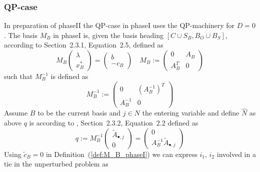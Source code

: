 \documentclass[a4paper]{article}
\begin{document}
\subsubsection{QP-case}
In preparation of phaseII the QP-case in phaseI uses the QP-machinery for $D=0$.
The basis $M_{B}$ in phaseI is, given the basis heading
$\left[C \cup S_{B}, B_{O} \cup B_{S} \right]$,
according to \cite{Sven} Section~2.3.1, Equation~2.5, defined as
\begin{equation}
\label{def:M_B_phaseI}
M_{B}
\left(\begin{array}{c}
        \lambda \\
	\hline
	x_{B}^{*}
      \end{array}
\right)
=
\left(\begin{array}{c}
        b \\
	\hline
	-c_{B}
       \end{array}
\right)
\quad
M_{B}:=
\left(\begin{array}{c|c}
        0 & A_{B} \\
	\hline
	A_{B}^{T} & 0 
       \end{array}
\right)
\end{equation}
such that $M_{B}^{-1}$ is defined as
\begin{equation}
\label{def:M_B_inv_phaseI}
M_{B}^{-1}:=
\left(\begin{array}{c|c}
        0 & \left(A_{B}^{-1}\right)^{T} \\
	\hline
	A_{B}^{-1} & 0
       \end{array}
\right)
\end{equation}
Assume $B$ to be the current basis and $j \in N$ the entering variable and
define $\hat{N}$ as above $q$ is according to \cite{Sven}, Section~2.3.2,
Equation~2.2 defined as
\begin{equation}
\label{def:q_phaseI}
q:= M_{B}^{-1}
\left(\begin{array}{c}
        \tilde{A}_{\bullet, j} \\
	\hline
        0
      \end{array}
\right)
=
\left(\begin{array}{c}
        0 \\
	\hline
	A_{B}^{-1}\tilde{A}_{\bullet, j}
       \end{array}
\right)
\end{equation}
Using $\tilde{c}_{B}=0$ in Definition~(\ref{def:M_B_phaseI})
we can express $i_{1}$, $i_{2}$ involved in a tie in the unperturbed problem
as
\end{document}
